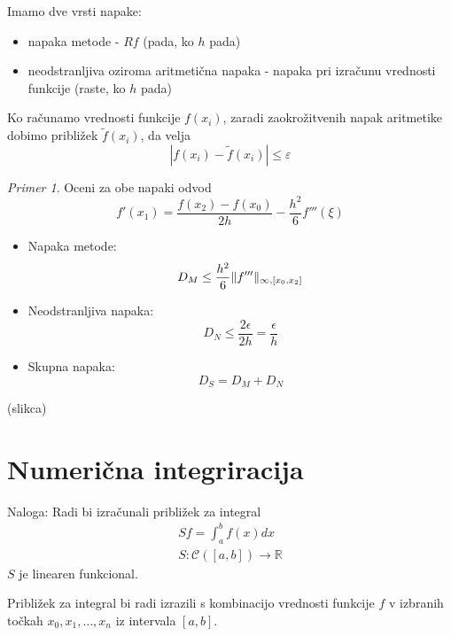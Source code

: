 \documentclass[a4paper,12pt]{article}
\DeclarePairedDelimiter\norm{\lVert}{\rVert}
\theoremstyle{definition}
\theoremstyle{remark}
\newtheorem*{ex}{Primer}
\newcommand{\R}{\mathbb{R}}
\begin{document}
Imamo dve vrsti napake:
\begin{itemize}
    \item napaka metode - $Rf$ (pada, ko $h$ pada)
    \item neodstranljiva oziroma aritmetična napaka - napaka pri izračunu vrednosti funkcije (raste, ko $h$ pada)
\end{itemize}

Ko računamo vrednosti funkcije $f(x_i)$, zaradi zaokrožitvenih napak aritmetike dobimo približek $\tilde{f}(x_i)$, da velja
\begin{equation*}
    \left| f(x_i) - \tilde{f}(x_i) \right| \leq \varepsilon
\end{equation*}

\begin{ex}
    Oceni za obe napaki odvod
    \begin{equation*}
        f'(x_1) = \frac{f(x_2) - f(x_0)}{2h} - \frac{h^2}{6} f'''(\xi)
    \end{equation*}
    \begin{itemize}
        \item Napaka metode:
        \begin{equation*}
            D_M \leq \frac{h^2}{6} \norm{f'''}_{\infty, [x_0, x_2]}
        \end{equation*}
        \item Neodstranljiva napaka:
        \begin{equation*}
            D_N \leq \frac{2\epsilon}{2h} = \frac{\epsilon}{h}
        \end{equation*}
        \item Skupna napaka:
        \begin{equation*}
            D_S = D_M + D_N
        \end{equation*}
    \end{itemize}
    (slikca)
\end{ex}

\newpage
\section{Numerična integriracija}
Naloga: Radi bi izračunali približek za integral
\begin{gather*}
    Sf = \int_{a}^{b} f(x) dx \\
    S: \mathscr{C}([a, b]) \to \R
\end{gather*}
$S$ je linearen funkcional.

Približek za integral bi radi izrazili s kombinacijo vrednosti funkcije $f$ v izbranih točkah $x_0, x_1, \dots, x_n$ iz intervala $[a, b]$.
\end{document}
